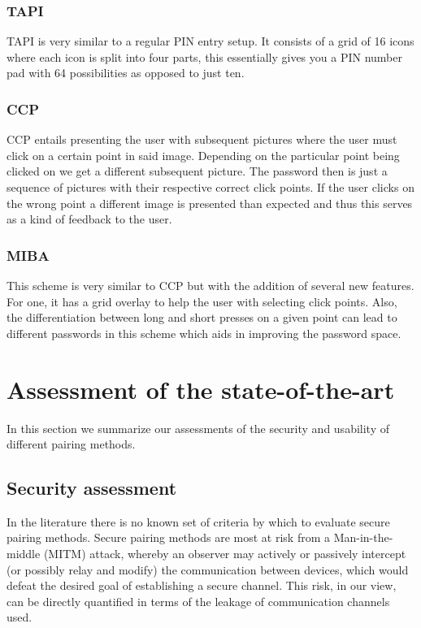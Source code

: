 \documentclass[conference, 11pt]{sty/IEEEtran}
\begin{document}
\subsubsection{TAPI}
\label{sssec:tapi}

TAPI is very similar to a regular PIN entry setup.
It consists of a grid of 16 icons where each icon is split into four parts, this essentially gives you a PIN number pad with 64 possibilities as opposed to just ten.

\subsubsection{CCP}
\label{sssec:ccp}

CCP entails presenting the user with subsequent pictures where the user must click on a certain point in said image.
Depending on the particular point being clicked on we get a different subsequent picture.
The password then is just a sequence of pictures with their respective correct click points.
If the user clicks on the wrong point a different image is presented than expected and thus this serves as a kind of feedback to the user.

\subsubsection{MIBA}
\label{sssec:miba}

This scheme is very similar to CCP but with the addition of several new features.
For one, it has a grid overlay to help the user with selecting click points.
Also, the differentiation between long and short presses on a given point can lead to different passwords in this scheme which aids in improving the password space.

\section{Assessment of the state-of-the-art}
\label{sec:assessment_of_the_state_of_the_art}

In this section we summarize our assessments of the security and usability of different pairing methods.

\subsection{Security assessment}
\label{ssec:security_assessment}

In the literature there is no known set of criteria by which to evaluate secure pairing methods.
Secure pairing methods are most at risk from a Man-in-the-middle (MITM) attack, whereby an observer may actively or passively intercept (or possibly relay and modify) the communication between devices, which would defeat the desired goal of establishing a secure channel.
This risk, in our view, can be directly quantified in terms of the leakage of communication channels used.
\end{document}
